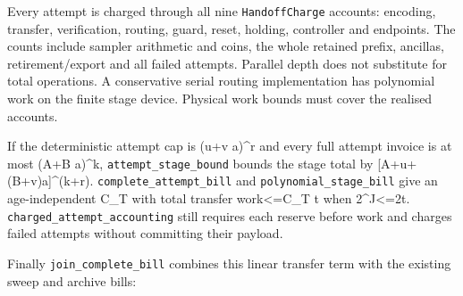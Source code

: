 \documentclass[
]{article}
\begin{document}
Every attempt is charged through all nine \texttt{HandoffCharge}
accounts: encoding, transfer, verification, routing, guard, reset,
holding, controller and endpoints. The counts include sampler arithmetic
and coins, the whole retained prefix, ancillas,
r\allowbreak{}e\allowbreak{}t\allowbreak{}i\allowbreak{}r\allowbreak{}e\allowbreak{}m\allowbreak{}e\allowbreak{}n\allowbreak{}t\allowbreak{}/\allowbreak{}e\allowbreak{}x\allowbreak{}p\allowbreak{}o\allowbreak{}r\allowbreak{}t
and all failed attempts. Parallel depth does not substitute for total
operations. A conservative serial routing implementation has polynomial
work on the finite stage device. Physical work bounds must cover the
realised accounts.

If the deterministic attempt cap is (u+v a)\^{}r and every full attempt
invoice is at most (A+B a)\^{}k,
\texttt{a\allowbreak{}t\allowbreak{}t\allowbreak{}e\allowbreak{}m\allowbreak{}p\allowbreak{}t\allowbreak{}\_\allowbreak{}s\allowbreak{}t\allowbreak{}a\allowbreak{}g\allowbreak{}e\allowbreak{}\_\allowbreak{}b\allowbreak{}o\allowbreak{}u\allowbreak{}n\allowbreak{}d}
bounds the stage total by {[}A+u+(B+v)a{]}\^{}(k+r).
\texttt{c\allowbreak{}o\allowbreak{}m\allowbreak{}p\allowbreak{}l\allowbreak{}e\allowbreak{}t\allowbreak{}e\allowbreak{}\_\allowbreak{}a\allowbreak{}t\allowbreak{}t\allowbreak{}e\allowbreak{}m\allowbreak{}p\allowbreak{}t\allowbreak{}\_\allowbreak{}b\allowbreak{}i\allowbreak{}l\allowbreak{}l}
and
\texttt{p\allowbreak{}o\allowbreak{}l\allowbreak{}y\allowbreak{}n\allowbreak{}o\allowbreak{}m\allowbreak{}i\allowbreak{}a\allowbreak{}l\allowbreak{}\_\allowbreak{}s\allowbreak{}t\allowbreak{}a\allowbreak{}g\allowbreak{}e\allowbreak{}\_\allowbreak{}b\allowbreak{}i\allowbreak{}l\allowbreak{}l}
give an age-independent C\_T with total transfer work\textless=C\_T t
when 2\^{}J\textless=2t.
\texttt{c\allowbreak{}h\allowbreak{}a\allowbreak{}r\allowbreak{}g\allowbreak{}e\allowbreak{}d\allowbreak{}\_\allowbreak{}a\allowbreak{}t\allowbreak{}t\allowbreak{}e\allowbreak{}m\allowbreak{}p\allowbreak{}t\allowbreak{}\_\allowbreak{}a\allowbreak{}c\allowbreak{}c\allowbreak{}o\allowbreak{}u\allowbreak{}n\allowbreak{}t\allowbreak{}i\allowbreak{}n\allowbreak{}g}
still requires each reserve before work and charges failed attempts
without committing their payload.

Finally
\texttt{j\allowbreak{}o\allowbreak{}i\allowbreak{}n\allowbreak{}\_\allowbreak{}c\allowbreak{}o\allowbreak{}m\allowbreak{}p\allowbreak{}l\allowbreak{}e\allowbreak{}t\allowbreak{}e\allowbreak{}\_\allowbreak{}b\allowbreak{}i\allowbreak{}l\allowbreak{}l}
combines this linear transfer term with the existing sweep and archive
bills:
\end{document}
